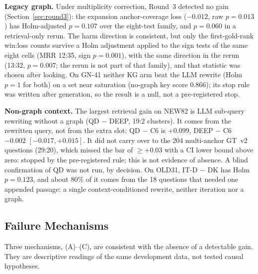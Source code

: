 \textbf{Legacy graph.} Under multiplicity correction, Round~3 detected no
gain (Section~\ref{sec:round3}): the expansion anchor-coverage
loss ($-0.012$, raw $p=0.013$) has Holm-adjusted $p=0.107$ over the
eight-test family, and $p=0.060$ in a retrieval-only rerun. The harm
direction is consistent, but only the first-gold-rank win:loss counts
survive a Holm adjustment applied to the sign tests of the same eight
cells (MRR 12:35, sign $p=0.001$), with the same direction in the rerun
(13:32, $p=0.007$; the rerun is not part of that family), and that
statistic was chosen after looking. On GN-41
neither KG arm beat the LLM rewrite (Holm $p=1$ for both) on a set near
saturation (no-graph key score 0.866); its stop rule was written after
generation, so the result is a null, not a pre-registered stop.

\textbf{Non-graph context.} The largest retrieval gain on NEW82 is LLM
sub-query rewriting without a graph (QD $-$ DEEP, 19:2 clusters). It comes
from the rewritten query, not from the extra slot: QD $-$ C6 is $+0.099$,
DEEP $-$ C6 $-0.002$ $[-0.017, +0.015]$. It did not carry over to the 204
multi-anchor GT~v2 questions (29:20), which missed the bar of $\ge +0.03$
with a CI lower bound above zero: stopped by the pre-registered rule;
this is not evidence of absence. A blind confirmation of QD was not run,
by decision. On OLD31, IT-D $-$ DK has Holm $p=0.123$, and about 80\% of
it comes from the 18 questions that needed one appended passage: a single
context-conditioned rewrite, neither iteration nor a graph.

\subsection{Failure Mechanisms}
\label{sec:rebuiltmech}

Three mechanisms, (A)--(C), are consistent with the absence of a
detectable gain. They are descriptive readings of the same development
data, not tested causal hypotheses.

